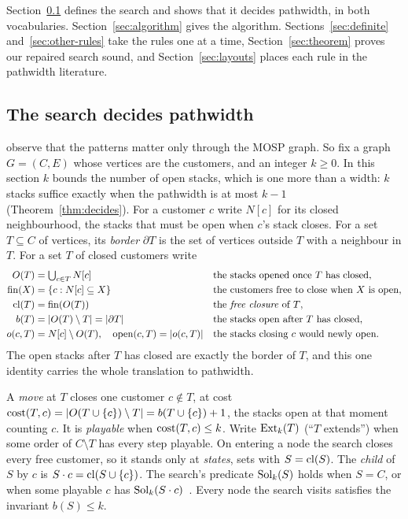 Section~\ref{sec:search-def} defines the search and shows that it decides
pathwidth, in both vocabularies. Section~\ref{sec:algorithm} gives the
algorithm. Sections~\ref{sec:definite} and~\ref{sec:other-rules} take the
rules one at a time, Section~\ref{sec:theorem} proves our repaired search
sound, and Section~\ref{sec:layouts} places each rule in the pathwidth
literature.

\subsection{The search decides pathwidth}
\label{sec:search-def}

\citet[p.~4]{ChuStuckey2009} observe that the patterns matter only through the
MOSP graph. So fix a graph $G=(C,E)$ whose vertices are the customers, and an
integer $k\ge0$. In this section $k$ bounds the number of open stacks, which is
one more than a width: $k$ stacks suffice exactly when the pathwidth is at most
$k-1$ (Theorem~\ref{thm:decides}). For a customer $c$ write $N[c]$ for its
closed neighbourhood, the stacks that must be open when $c$'s stack closes. For
a set $T\subseteq C$ of vertices, its \emph{border} $\partial T$ is the set of
vertices outside $T$ with a neighbour in $T$. For a set $T$ of closed
customers write
\begin{align*}
O(T) &= \textstyle\bigcup_{c\in T}N[c] && \text{the stacks opened once $T$ has closed},\\
\mathrm{fin}(X) &= \{c : N[c]\subseteq X\} && \text{the customers free to close when $X$ is open},\\
\mathrm{cl}(T) &= \mathrm{fin}(O(T)) && \text{the \emph{free closure} of $T$},\\
b(T) &= |O(T)\setminus T| = |\partial T| && \text{the stacks open after $T$ has closed},\\
o(c,T) &= N[c]\setminus O(T),\quad \mathrm{open}(c,T)=|o(c,T)| && \text{the stacks closing $c$ would newly open.}
\end{align*}
The open stacks after $T$ has closed are exactly the border of $T$, and this
one identity carries the whole translation to pathwidth.

A \emph{move} at $T$ closes one customer $c\notin T$, at cost
$\mathrm{cost}(T,c)=|O(T\cup\{c\})\setminus T| = b(T\cup\{c\})+1$, the stacks open at
that moment counting $c$. It is \emph{playable} when $\mathrm{cost}(T,c)\le k$. Write
$\mathrm{Ext}_k(T)$ (``$T$ extends'') when some order of $C\setminus T$ has every step playable. On entering
a node the search closes every free customer, so it stands only at
\emph{states}, sets with $S=\mathrm{cl}(S)$. The \emph{child} of $S$ by $c$ is
$S\cdot c=\mathrm{cl}(S\cup\{c\})$. The search's predicate $\mathrm{Sol}_k(S)$ holds when
$S=C$, or when some playable $c$ has $\mathrm{Sol}_k(S\cdot c)$~. Every
node the search visits satisfies the invariant $b(S)\le k$.

